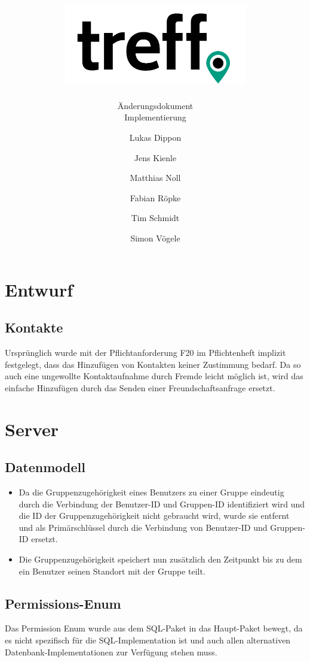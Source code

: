\documentclass[parskip=full,11pt]{scrartcl}
\title{\includegraphics[width = 80mm]{images/logo_crop.png}}
\subtitle{\huge Änderungsdokument\\Implementierung}
\author{Lukas Dippon
        \and Jens Kienle
        \and Matthias Noll
        \and Fabian Röpke
        \and Tim Schmidt
        \and Simon Vögele}
\begin{document}
\maketitle
\thispagestyle{empty} %

\pagebreak
\tableofcontents

\pagebreak
\section{Entwurf}

\subsection{Kontakte}
Ursprünglich wurde mit der Pflichtanforderung F20 im Pflichtenheft implizit 
festgelegt, dass das Hinzufügen von Kontakten keiner Zustimmung bedarf. Da so 
auch eine ungewollte Kontaktaufnahme durch Fremde leicht möglich ist, wird das 
einfache Hinzufügen durch das Senden einer Freundschaftsanfrage ersetzt.

\pagebreak
\section{Server}

\subsection{Datenmodell}
	\begin{itemize}
	\item Da die Gruppenzugehörigkeit eines Benutzers zu einer Gruppe eindeutig
		durch die Verbindung der Benutzer-ID und Gruppen-ID identifiziert wird
		und die ID der Gruppenzugehörigkeit nicht gebraucht wird, wurde sie
		entfernt und als Primärschlüssel durch die Verbindung von Benutzer-ID
		und Gruppen-ID ersetzt.
	\item Die Gruppenzugehörigkeit speichert nun zusätzlich den Zeitpunkt bis
		zu dem ein Benutzer seinen Standort mit der Gruppe teilt.
	\end{itemize}

\subsection{Permissions-Enum}
Das Permission Enum wurde aus dem SQL-Paket in das Haupt-Paket bewegt, da es
nicht spezifisch für die SQL-Implementation ist und auch allen alternativen
Datenbank-Implementationen zur Verfügung stehen muss.
\end{document}
